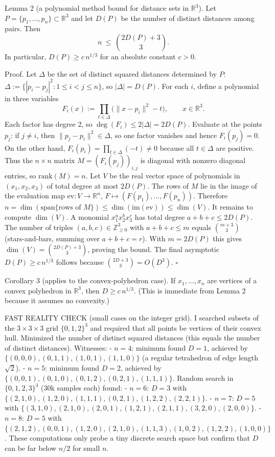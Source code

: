 Lemma 2 (a polynomial method bound for distance sets in $\mathbb{R}^3$).
Let $P=\{p_1,\ldots,p_n\}\subset\mathbb{R}^3$ and let $D(P)$ be the number of distinct distances among pairs.
Then
\[
n\ \le\ \binom{2D(P)+3}{3}.
\]
In particular, $D(P)\ge c\,n^{1/3}$ for an absolute constant $c>0$.

Proof.
Let $\Delta$ be the set of distinct squared distances determined by $P$:
$\Delta:=\{|p_i-p_j|^2:1\le i<j\le n\}$, so $|\Delta|=D(P)$.
For each $i$, define a polynomial in three variables
\[
F_i(x):=\prod_{t\in\Delta}\bigl(\|x-p_i\|^2-t\bigr),\qquad x\in\mathbb{R}^3.
\]
Each factor has degree $2$, so $\deg(F_i)\le 2|\Delta|=2D(P)$.
Evaluate at the points $p_j$: if $j\neq i$, then $\|p_j-p_i\|^2\in\Delta$, so one factor vanishes and hence $F_i(p_j)=0$.
On the other hand, $F_i(p_i)=\prod_{t\in\Delta}(-t)\neq 0$ because all $t\in\Delta$ are positive.
Thus the $n\times n$ matrix $M=(F_i(p_j))_{i,j}$ is diagonal with nonzero diagonal entries, so $\mathrm{rank}(M)=n$.
Let $V$ be the real vector space of polynomials in $(x_1,x_2,x_3)$ of total degree at most $2D(P)$.
The rows of $M$ lie in the image of the evaluation map $\mathrm{ev}:V\to\mathbb{R}^n$, $F\mapsto (F(p_1),\ldots,F(p_n))$. Therefore
$n=\dim(\mathrm{span}\{\text{rows of }M\})\le \dim(\mathrm{im}(\mathrm{ev}))\le \dim(V)$.
It remains to compute $\dim(V)$. A monomial $x_1^{a}x_2^{b}x_3^{c}$ has total degree $a+b+c\le 2D(P)$.
The number of triples $(a,b,c)\in\mathbb{Z}_{\ge 0}^3$ with $a+b+c\le m$ equals $\binom{m+3}{3}$ (stars-and-bars, summing over $a+b+c=r$).
With $m=2D(P)$ this gives $\dim(V)=\binom{2D(P)+3}{3}$, proving the bound.
The final asymptotic $D(P)\ge c\,n^{1/3}$ follows because $\binom{2D+3}{3}=O(D^3)$. $\square$

Corollary 3 (applies to the convex-polyhedron case).
If $x_1,\ldots,x_n$ are vertices of a convex polyhedron in $\mathbb{R}^3$, then $D\ge c\,n^{1/3}$.
(This is immediate from Lemma 2 because it assumes no convexity.)

FAST REALITY CHECK (small cases on the integer grid).
I searched subsets of the $3\times 3\times 3$ grid $\{0,1,2\}^3$ and required that all points be vertices of their convex hull.
Minimized the number of distinct squared distances (this equals the number of distinct distances). Witnesses:
- $n=4$: minimum found $D=1$, achieved by $\{(0,0,0), (0,1,1), (1,0,1), (1,1,0)\}$ (a regular tetrahedron of edge length $\sqrt 2$).
- $n=5$: minimum found $D=2$, achieved by $\{(0,0,1), (0,1,0), (0,1,2), (0,2,1), (1,1,1)\}$. 
Random search in $\{0,1,2,3\}^3$ (30k samples each) found:
- $n=6$: $D=3$ with $\{(2,1,0), (1,2,0), (1,1,1), (0,2,1), (1,2,2), (2,2,1)\}$. 
- $n=7$: $D=5$ with $\{(3,1,0), (2,1,0), (2,0,1), (1,2,1), (2,1,1), (3,2,0), (2,0,0)\}$. 
- $n=8$: $D=5$ with $\{(2,1,2), (0,0,1), (1,2,0), (2,1,0), (1,1,3), (1,0,2), (1,2,2), (1,0,0)\}$. 
These computations only probe a tiny discrete search space but confirm that $D$ can be far below $n/2$ for small $n$.

